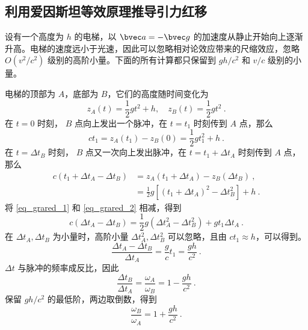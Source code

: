 \subsection{利用爱因斯坦等效原理推导引力红移}
设有一个高度为 $h$ 的电梯，以 $\bvec a=-\bvec g$ 的加速度从静止开始向上逐渐升高。电梯的速度远小于光速，因此可以忽略相对论效应带来的尺缩效应，忽略 $O(v^2/c^2)$ 级别的高阶小量。下面的所有计算都只保留到 $gh/c^2$ 和 $v/c$ 级别的小量。

电梯的顶部为 $A$，底部为 $B$，它们的高度随时间变化为
\begin{equation}
z_A(t)=\frac{1}{2}gt^2+h,\quad z_B(t)=\frac{1}{2}gt^2~.
\end{equation}
在 $t=0$ 时刻， $B$ 点向上发出一个脉冲，在 $t=t_1$ 时刻传到 $A$ 点，那么
\begin{equation}\label{eq_grared_1}
ct_1 = z_A(t_1)-z_B(0)=\frac{1}{2}g t_1^2+h ~.
\end{equation}
在 $t=\Delta t_B$ 时刻， $B$ 点又一次向上发出脉冲，在 $t=t_1+\Delta t_A$ 时刻传到 $A$ 点，那么
\begin{equation}\label{eq_grared_2}
\begin{aligned}
c (t_1+\Delta t_A - \Delta t_B) &= z_A(t_1+\Delta t_A) - z_B(\Delta t_B)~,
\\
&=\frac{1}{2} g[(t_1+\Delta t_A)^2-\Delta t_B^2] +h
~.
\end{aligned}
\end{equation}
将 \autoref{eq_grared_1} 和 \autoref{eq_grared_2} 相减，得到
\begin{equation}
c(\Delta t_A-\Delta t_B)=\frac{1}{2}g(\Delta t_A^2-\Delta t_B^2)+gt_1 \Delta t_A~.
\end{equation}
在 $\Delta t_A,\Delta t_B$ 为小量时，高阶小量 $\Delta t_A^2,\Delta t_B^2$ 可以忽略，且由  $c t_1\approx h$，可以得到。
\begin{equation}
\frac{\Delta t_A-\Delta t_B}{\Delta t_A} = \frac{g}{c}t_1=\frac{gh}{c^2}~.
\end{equation}
$\Delta t$ 与脉冲的频率成反比，因此
\begin{equation}
\frac{\Delta t_B}{\Delta t_A} = \frac{\omega_A}{\omega_B} = 1-\frac{gh}{c^2}~.
\end{equation}
保留 $gh/c^2$ 的最低阶，两边取倒数，得到
\begin{equation}
\frac{\omega_B}{\omega_A} = 1+\frac{gh}{c^2}~.
\end{equation}

